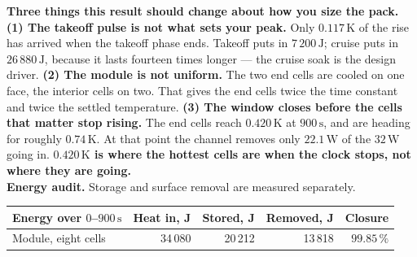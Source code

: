 \documentclass[9pt,a4paper]{article}
\renewcommand{\footnotesize}{\fontsize{6.9}{7.5}\selectfont}
\begin{document}
\vspace{1pt}
\colorbox{keyfill}{\begin{minipage}{0.988\textwidth}
\vspace{1pt}
{\footnotesize\textbf{Three things this result should change about how you size
the pack.} \textbf{(1) The takeoff pulse is not what sets your peak.} Only
$0.117\,\mathrm{K}$ of the rise has arrived when the takeoff phase ends.
Takeoff puts in $7\,200\,\mathrm{J}$; cruise puts in $26\,880\,\mathrm{J}$,
because it lasts fourteen times longer --- the cruise soak is the design driver.
\textbf{(2) The module is not uniform.} The two end cells are cooled on one
face, the interior cells on two. That gives the end cells twice the time
constant and twice the settled temperature. \textbf{(3) The window closes before the
cells that matter stop rising.} The end cells reach $0.420\,\mathrm{K}$ at
$900\,\mathrm{s}$, and are heading for roughly $0.74\,\mathrm{K}$. At that
point the channel removes only $22.1\,\mathrm{W}$ of the $32\,\mathrm{W}$
going in. \textbf{$0.420\,\mathrm{K}$ is where the hottest cells are when the
clock stops, not where they are going.}\\[1.5pt]
\textbf{Energy audit.} Storage and surface removal are measured separately.}

\vspace{0.5pt}
{\fontsize{6.7}{7.4}\selectfont
\begin{tabular}{l r r r r}
\toprule
Energy over $0$--$900\,\mathrm{s}$ & Heat in, J & Stored, J &
Removed, J & Closure \\
\midrule
Module, eight cells & 34\,080 & 20\,212 & 13\,818 & $\mathbf{99.85\,\%}$ \\
\bottomrule
\end{tabular}}
\vspace{1pt}
\end{minipage}}
\end{document}
